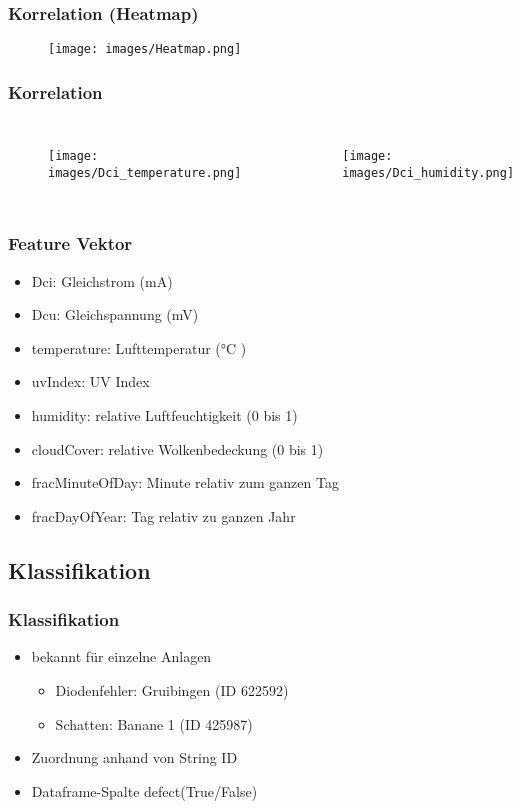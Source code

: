\documentclass[utf8x, xcolor=dvipsnames]{beamer}
\begin{document}
\begin{frame}
\frametitle{Korrelation (Heatmap)}
\begin{figure}
	\texttt{[image: images/Heatmap.png]}
\end{figure}
\end{frame}

\begin{frame}
\frametitle{Korrelation}
\begin{columns}[t]
		\begin{figure}
			\texttt{[image: images/Dci\_temperature.png]}
		\end{figure}
		\begin{figure}
			\texttt{[image: images/Dci\_humidity.png]}
		\end{figure}
\end{columns}
\end{frame}

\begin{frame}
\frametitle{Feature Vektor}
\begin{itemize}
	\item Dci: Gleichstrom (\si{\milli\ampere})
	\item Dcu: Gleichspannung (\si{\milli\volt})
	\item temperature: Lufttemperatur (\si{\celsius} )
	\item uvIndex: UV Index
	\item humidity: relative Luftfeuchtigkeit (0 bis 1)
	\item cloudCover: relative Wolkenbedeckung (0 bis 1)
	\item fracMinuteOfDay: Minute relativ zum ganzen Tag
	\item fracDayOfYear: Tag relativ zu ganzen Jahr
\end{itemize}
\end{frame}

\subsection{Klassifikation}

\begin{frame}
\frametitle{Klassifikation}
\begin{itemize}
	\item bekannt für einzelne Anlagen
	\begin{itemize}
		\item Diodenfehler: Gruibingen (ID 622592)
		\item Schatten: Banane 1 (ID 425987)\newline
	\end{itemize}
	\item Zuordnung anhand von String ID\newline
	\item Dataframe-Spalte \glq{}defect\grq (True/False)
\end{itemize}
\end{frame}
\end{document}
